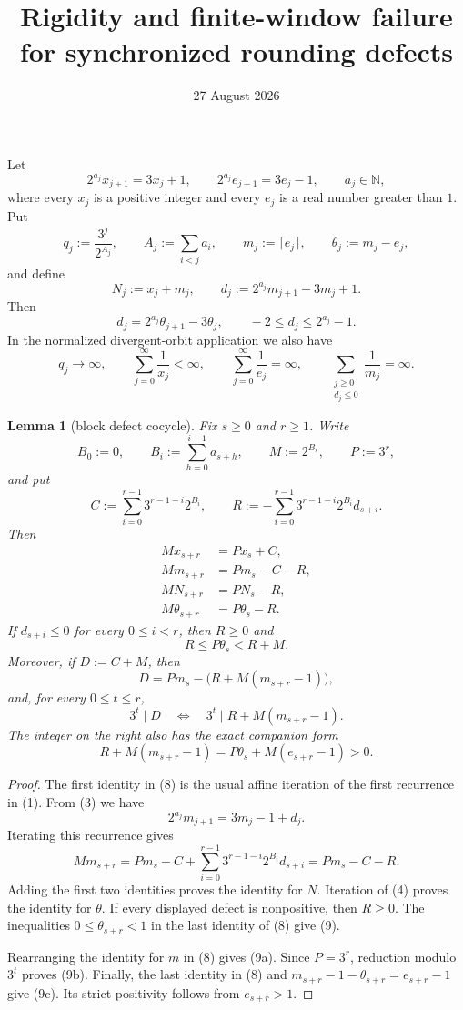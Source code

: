 \documentclass[11pt]{article}
\title{Rigidity and finite-window failure for synchronized rounding defects}
\author{}
\date{27 August 2026}
\newtheorem{lemma}[theorem]{Lemma}
\newcommand{\N}{\mathbb N}
\begin{document}
\maketitle

Let
\[
  2^{a_j}x_{j+1}=3x_j+1,
  \qquad
  2^{a_j}e_{j+1}=3e_j-1,
  \qquad a_j\in\N,
  \tag{1}
\]
where every $x_j$ is a positive integer and every $e_j$ is a real number
greater than $1$.  Put
\[
  q_j:=\frac{3^j}{2^{A_j}},
  \qquad A_j:=\sum_{i<j}a_i,
  \qquad
  m_j:=\lceil e_j\rceil,
  \qquad
  \theta_j:=m_j-e_j,
  \tag{2}
\]
and define
\[
  N_j:=x_j+m_j,
  \qquad
  d_j:=2^{a_j}m_{j+1}-3m_j+1.
  \tag{3}
\]
Then
\[
  d_j=2^{a_j}\theta_{j+1}-3\theta_j,
  \qquad -2\leq d_j\leq 2^{a_j}-1.
  \tag{4}
\]
In the normalized divergent-orbit application we also have
\[
  q_j\longrightarrow\infty,
  \qquad
  \sum_{j=0}^{\infty}\frac1{x_j}<\infty,
  \qquad
  \sum_{j=0}^{\infty}\frac1{e_j}=\infty,
  \qquad
  \sum_{\substack{j\geq0\\d_j\leq0}}\frac1{m_j}=\infty.
  \tag{5}
\]

\begin{lemma}[block defect cocycle]
Fix $s\geq0$ and $r\geq1$.  Write
\[
  B_0:=0,
  \qquad
  B_i:=\sum_{h=0}^{i-1}a_{s+h},
  \qquad
  M:=2^{B_r},
  \qquad
  P:=3^r,
  \tag{6}
\]
and put
\[
  C:=\sum_{i=0}^{r-1}3^{r-1-i}2^{B_i},
  \qquad
  R:=-\sum_{i=0}^{r-1}3^{r-1-i}2^{B_i}d_{s+i}.
  \tag{7}
\]
Then
\[
\begin{aligned}
  Mx_{s+r}&=Px_s+C,\\
  Mm_{s+r}&=Pm_s-C-R,\\
  MN_{s+r}&=PN_s-R,\\
  M\theta_{s+r}&=P\theta_s-R.
\end{aligned}
\tag{8}
\]
If $d_{s+i}\leq0$ for every $0\leq i<r$, then $R\geq0$ and
\[
  R\leq P\theta_s<R+M.
  \tag{9}
\]
Moreover, if $D:=C+M$, then
\[
  D
  =Pm_s-\bigl(R+M(m_{s+r}-1)\bigr),
  \tag{9a}
\]
and, for every $0\leq t\leq r$,
\[
\boxed{
  3^t\mid D
  \quad\Longleftrightarrow\quad
  3^t\mid R+M(m_{s+r}-1).}
  \tag{9b}
\]
The integer on the right also has the exact companion form
\[
  R+M(m_{s+r}-1)
  =P\theta_s+M(e_{s+r}-1)>0.
  \tag{9c}
\]
\end{lemma}

\begin{proof}
The first identity in (8) is the usual affine iteration of the first
recurrence in (1).  From (3) we have
\[
  2^{a_j}m_{j+1}=3m_j-1+d_j.
\]
Iterating this recurrence gives
\[
  Mm_{s+r}
  =Pm_s-C+\sum_{i=0}^{r-1}3^{r-1-i}2^{B_i}d_{s+i}
  =Pm_s-C-R.
\]
Adding the first two identities proves the identity for $N$.  Iteration of
(4) proves the identity for $\theta$.  If every displayed defect is
nonpositive, then $R\geq0$.  The inequalities $0\leq\theta_{s+r}<1$ in the
last identity of (8) give (9).

Rearranging the identity for $m$ in (8) gives (9a).  Since $P=3^r$,
reduction modulo $3^t$ proves (9b).  Finally, the last identity in (8) and
$m_{s+r}-1-\theta_{s+r}=e_{s+r}-1$ give (9c).  Its strict positivity follows
from $e_{s+r}>1$.
\end{proof}
\end{document}
